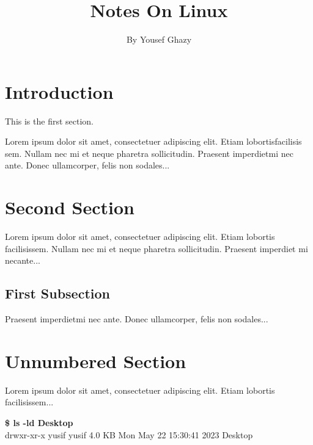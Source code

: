 \documentclass[12pt]{article}
\begin{document}
\author{By Yousef Ghazy}
\title{Notes On Linux}
\maketitle

\newpage

\section{Introduction}

This is the first section.

Lorem  ipsum  dolor  sit  amet,  consectetuer  adipiscing  
elit. Etiam  lobortisfacilisis sem.  Nullam nec mi et 
neque pharetra sollicitudin.  Praesent imperdietmi nec ante. 
Donec ullamcorper, felis non sodales...

\section{Second Section}

Lorem ipsum dolor sit amet, consectetuer adipiscing elit.  
Etiam lobortis facilisissem.  Nullam nec mi et neque pharetra 
sollicitudin.  Praesent imperdiet mi necante...

\subsection{First Subsection}
Praesent imperdietmi nec ante. Donec ullamcorper, felis non sodales...

\section*{Unnumbered Section}
Lorem ipsum dolor sit amet, consectetuer adipiscing elit.  
Etiam lobortis facilisissem...
\\

\begin{ttfamily}
    {\bf \$ ls -ld Desktop\\}
    drwxr-xr-x yusif yusif 4.0 KB Mon May 22 15:30:41 2023 Desktop
\end{ttfamily}
\end{document}
